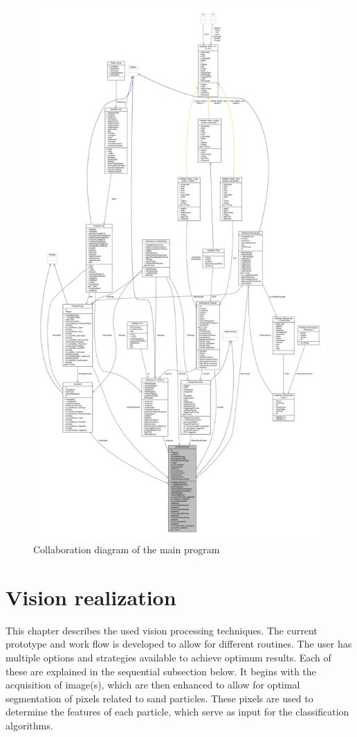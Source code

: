 \documentclass[11pt,fleqn,,a4paper,twoside,openright]{book}
\begin{document}
\begin{figure}[h]
	\includegraphics[page=1,height=\textheight]{../../Doxygen/latex/class_v_s_a_main_window__coll__graph.pdf}
	\caption{Collaboration diagram of the main program}\label{fig:CollDiagramVSA}
\end{figure}

\chapter{Vision realization}\label{chap:VisionRealization}
This chapter describes the used vision processing techniques. The current prototype and work flow is developed to allow for different routines. The user has multiple options and strategies available to achieve optimum results. Each of these are explained in the sequential subsection below. It begins with the acquisition of image(s), which are then enhanced to allow for optimal segmentation of pixels related to sand particles. These pixels are used to determine the features of each particle, which serve as input for the classification algorithms.
\end{document}
